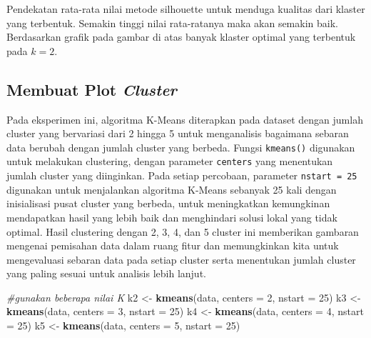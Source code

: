 \documentclass[
  oneside]{book}
\newenvironment{Shaded}{\begin{snugshade}}{\end{snugshade}}
\newcommand{\AttributeTok}[1]{\textcolor[rgb]{0.13,0.29,0.53}{#1}}
\newcommand{\CommentTok}[1]{\textcolor[rgb]{0.56,0.35,0.01}{\textit{#1}}}
\newcommand{\DecValTok}[1]{\textcolor[rgb]{0.00,0.00,0.81}{#1}}
\newcommand{\FunctionTok}[1]{\textcolor[rgb]{0.13,0.29,0.53}{\textbf{#1}}}
\newcommand{\NormalTok}[1]{#1}
\newcommand{\OtherTok}[1]{\textcolor[rgb]{0.56,0.35,0.01}{#1}}
\begin{document}
Pendekatan rata-rata nilai metode silhouette untuk menduga kualitas dari klaster yang terbentuk. Semakin tinggi nilai rata-ratanya maka akan semakin baik. Berdasarkan grafik pada gambar di atas banyak klaster optimal yang terbentuk pada \(k=2\).

\subsection*{\texorpdfstring{Membuat Plot \emph{Cluster}}{Membuat Plot Cluster}}\label{membuat-plot-cluster}

Pada eksperimen ini, algoritma K-Means diterapkan pada dataset dengan jumlah cluster yang bervariasi dari 2 hingga 5 untuk menganalisis bagaimana sebaran data berubah dengan jumlah cluster yang berbeda. Fungsi \texttt{kmeans()} digunakan untuk melakukan clustering, dengan parameter \texttt{centers} yang menentukan jumlah cluster yang diinginkan. Pada setiap percobaan, parameter \texttt{nstart\ =\ 25} digunakan untuk menjalankan algoritma K-Means sebanyak 25 kali dengan inisialisasi pusat cluster yang berbeda, untuk meningkatkan kemungkinan mendapatkan hasil yang lebih baik dan menghindari solusi lokal yang tidak optimal. Hasil clustering dengan 2, 3, 4, dan 5 cluster ini memberikan gambaran mengenai pemisahan data dalam ruang fitur dan memungkinkan kita untuk mengevaluasi sebaran data pada setiap cluster serta menentukan jumlah cluster yang paling sesuai untuk analisis lebih lanjut.

\begin{Shaded}
\begin{Highlighting}[]
\CommentTok{\#gunakan beberapa nilai K}
\NormalTok{k2 }\OtherTok{\textless{}{-}} \FunctionTok{kmeans}\NormalTok{(data, }\AttributeTok{centers =} \DecValTok{2}\NormalTok{, }\AttributeTok{nstart =} \DecValTok{25}\NormalTok{)}
\NormalTok{k3 }\OtherTok{\textless{}{-}} \FunctionTok{kmeans}\NormalTok{(data, }\AttributeTok{centers =} \DecValTok{3}\NormalTok{, }\AttributeTok{nstart =} \DecValTok{25}\NormalTok{)}
\NormalTok{k4 }\OtherTok{\textless{}{-}} \FunctionTok{kmeans}\NormalTok{(data, }\AttributeTok{centers =} \DecValTok{4}\NormalTok{, }\AttributeTok{nstart =} \DecValTok{25}\NormalTok{)}
\NormalTok{k5 }\OtherTok{\textless{}{-}} \FunctionTok{kmeans}\NormalTok{(data, }\AttributeTok{centers =} \DecValTok{5}\NormalTok{, }\AttributeTok{nstart =} \DecValTok{25}\NormalTok{)}
\end{Highlighting}
\end{Shaded}
\end{document}
